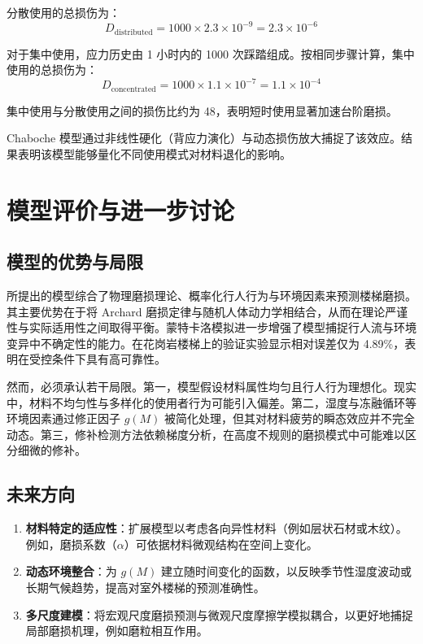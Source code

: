 \documentclass[11pt,a4paper]{ctexart}
\begin{document}
分散使用的总损伤为：
\begin{equation*}
D_{\mathrm{distributed}} = 1000\times 2.3\times 10^{-9} = 2.3\times 10^{-6}
\end{equation*}

对于集中使用，应力历史由 1 小时内的 1000 次踩踏组成。按相同步骤计算，集中使用的总损伤为：
\begin{equation*}
D_{\mathrm{concentrated}} = 1000\times 1.1\times 10^{-7} = 1.1\times 10^{-4}
\end{equation*}

集中使用与分散使用之间的损伤比约为 48，表明短时使用显著加速台阶磨损。

Chaboche 模型通过非线性硬化（背应力演化）与动态损伤放大捕捉了该效应。结果表明该模型能够量化不同使用模式对材料退化的影响。

\section{模型评价与进一步讨论}

\subsection{模型的优势与局限}

所提出的模型综合了物理磨损理论、概率化行人行为与环境因素来预测楼梯磨损。其主要优势在于将 Archard 磨损定律与随机人体动力学相结合，从而在理论严谨性与实际适用性之间取得平衡。蒙特卡洛模拟进一步增强了模型捕捉行人流与环境变异中不确定性的能力。在花岗岩楼梯上的验证实验显示相对误差仅为 4.89\%，表明在受控条件下具有高可靠性。

然而，必须承认若干局限。第一，模型假设材料属性均匀且行人行为理想化。现实中，材料不均匀性与多样化的使用者行为可能引入偏差。第二，湿度与冻融循环等环境因素通过修正因子 $g(M)$ 被简化处理，但其对材料疲劳的瞬态效应并不完全动态。第三，修补检测方法依赖梯度分析，在高度不规则的磨损模式中可能难以区分细微的修补。

\subsection{未来方向}

\begin{enumerate}
\item \textbf{材料特定的适应性}：扩展模型以考虑各向异性材料（例如层状石材或木纹）。例如，磨损系数（$\alpha$）可依据材料微观结构在空间上变化。
\item \textbf{动态环境整合}：为 $g(M)$ 建立随时间变化的函数，以反映季节性湿度波动或长期气候趋势，提高对室外楼梯的预测准确性。
\item \textbf{多尺度建模}：将宏观尺度磨损预测与微观尺度摩擦学模拟耦合，以更好地捕捉局部磨损机理，例如磨粒相互作用。
\end{enumerate}
\end{document}
